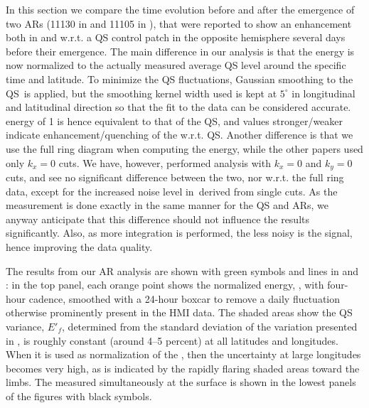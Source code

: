 \documentclass{aa}
\begin{document}
In this section we compare the \fff time evolution before and after the emergence of 
two ARs (11130 in  and 11105 in ), that were reported to show an enhancement both in \cite{SRB16} and \cite{Waidele22} w.r.t. a QS control patch
in the opposite hemisphere several days before their emergence. The main difference in our analysis
is that the \fff energy is now normalized to the actually measured average QS level
around the specific time and latitude. To minimize
the QS fluctuations, Gaussian smoothing to the QS \ef\,is applied, 
but the smoothing kernel width used is kept at 
$5^\circ$ in longitudinal and latitudinal direction
so that the fit to the data can be considered accurate.
\fff energy of 1 is hence
equivalent to that of the QS, and values stronger/weaker 
indicate enhancement/quenching of the \fff w.r.t. QS.
Another difference is that we use the
full ring diagram when computing the \fff energy, while the
other papers used only $k_x=0$ cuts. We have, however, performed
analysis with $k_x=0$ and $k_y=0$ cuts, and see no significant
difference between the two, nor w.r.t. the full ring data, except for the
increased noise level in \ef\,derived from single cuts.
As the measurement is done exactly in the same
manner for the QS and ARs, we anyway anticipate
that this difference should not influence the results significantly. 
Also, as more integration is performed, the less noisy is the 
signal, hence improving the data quality. 

The results from our AR analysis are shown with green symbols and lines in  and : in the top panel, each orange point shows the normalized \fff energy, \eft, with four-hour cadence, 
smoothed with a 24-hour boxcar to remove a daily fluctuation
otherwise prominently present in the HMI data. The shaded areas show the QS variance, $E'_f$,
determined from the standard deviation of the variation presented in ,
is roughly constant (around 4--5 percent) at all latitudes and longitudes. When it is used as normalization of the \fffns, then the uncertainty at large longitudes becomes very high, as is indicated by the rapidly 
flaring 
shaded areas toward the limbs. The \brms{} measured simultaneously at the surface is shown in the lowest panels of the figures with black symbols. 
\end{document}
